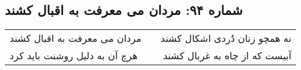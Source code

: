 \begin{center}
\section*{شماره ۹۴: مردان می معرفت به اقبال کشند}
\label{sec:094}
\begin{longtable}{l p{0.5cm} r}
مردان می معرفت به اقبال کشند
&&
نه همچو زنان دُردی اشکال کشند
\\
هرچ آن به دلیل روشنت باید کرد
&&
آبیست که از چاه به غربال کشند
\\
\end{longtable}
\end{center}
